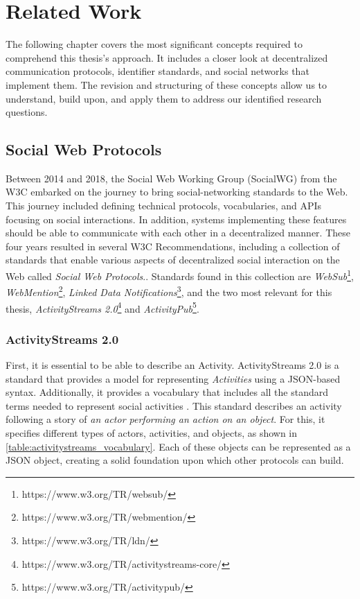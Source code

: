 \chapter{Related Work}
\label{cha:relatedwork}

The following chapter covers the most significant concepts required to comprehend this thesis's approach. It includes a closer look at decentralized communication protocols, identifier standards, and social networks that implement them. The revision and structuring of these concepts allow us to understand, build upon, and apply them to address our identified research questions.

\section{Social Web Protocols}
Between 2014 and 2018, the Social Web Working Group (SocialWG) from the W3C embarked on the journey to bring social-networking standards to the Web. This journey included defining technical protocols, vocabularies, and APIs focusing on social interactions. In addition, systems implementing these features should be able to communicate with each other in a decentralized manner. These four years resulted in several W3C Recommendations, including a collection of standards that enable various aspects of decentralized social interaction on the Web called \emph{Social Web Protocols}.\cite{celik_prodromou_le_hors_2014}. Standards found in this collection are \emph{WebSub}\footnote{https://www.w3.org/TR/websub/}, \emph{WebMention}\footnote{https://www.w3.org/TR/webmention/}, \emph{Linked Data Notifications}\footnote{https://www.w3.org/TR/ldn/}, and the two most relevant for this thesis, \emph{ActivityStreams 2.0}\footnote{https://www.w3.org/TR/activitystreams-core/} and \emph{ActivityPub}\footnote{https://www.w3.org/TR/activitypub/}.

\subsection{ActivityStreams 2.0}\label{subsec:activitystreams}
First, it is essential to be able to describe an Activity. ActivityStreams 2.0 is a standard that provides a model for representing \emph{Activities} using a JSON-based syntax. Additionally, it provides a vocabulary that includes all the standard terms needed to represent social activities \cite{snell_prodromou_2017}. This standard describes an activity following a story of \emph{an actor performing an action on an object}. For this, it specifies different types of actors, activities, and objects, as shown in \autoref{table:activitystreams_vocabulary}. Each of these objects can be represented as a JSON object, creating a solid foundation upon which other protocols can build. 

